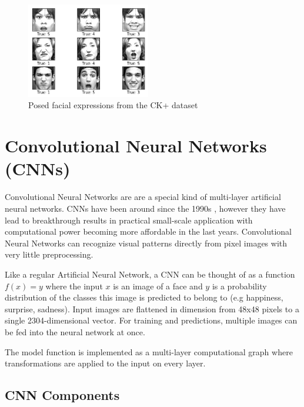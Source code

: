 \documentclass[twoside]{article}
\begin{document}
\begin{multicols}{2}
\begin{figure}[H]
	\includegraphics[width=0.48\textwidth]{ckplus_examples}
	\caption{Posed facial expressions from the CK+ dataset}
\end{figure}


\section{Convolutional Neural Networks (CNNs)}
Convolutional Neural Networks are are a special kind of multi-layer artificial neural networks. CNNs have been around since the 1990s \cite{lecun98}, however they have lead to breakthrough results in practical small-scale application with computational power becoming more affordable in the last years. Convolutional Neural Networks can recognize visual patterns directly from pixel images with very little preprocessing. 

Like a regular Artificial Neural Network, a CNN can be thought of as a function $f(x) = y$ where the input $x$ is an image of a face and $y$ is a probability distribution of the classes this image is predicted to belong to (e.g happiness, surprise, sadness). Input images are flattened in dimension from 48x48 pixels to a single 2304-dimensional vector. For training and predictions, multiple images can be fed into the neural network at once.

The model function is implemented as a multi-layer computational graph where transformations are applied to the input on every layer.


\subsection{CNN Components}


\end{multicols}
\end{document}
